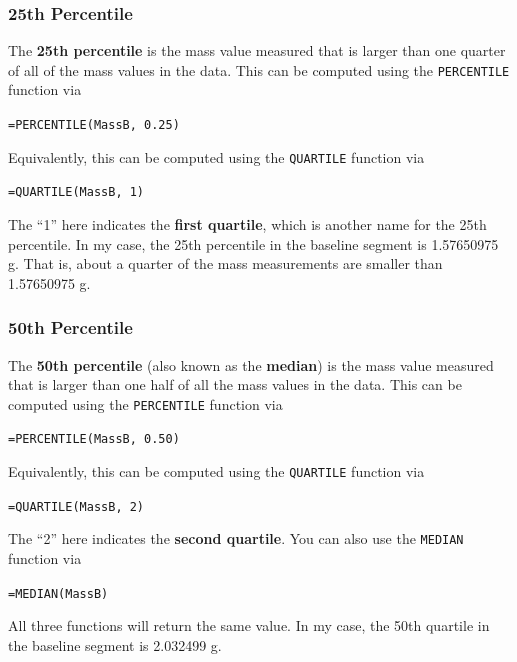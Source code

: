 \subsubsection{25th Percentile}
The \textbf{25th percentile} is the mass value measured that is larger than one quarter of all of the mass values in the data. This can be computed using the \texttt{PERCENTILE} function via
\begin{center}
    \texttt{=PERCENTILE(MassB, 0.25)}
\end{center}
Equivalently, this can be computed using the \texttt{QUARTILE} function via
\begin{center}
    \texttt{=QUARTILE(MassB, 1)}
\end{center}
The ``1'' here indicates the \textbf{first quartile}, which is another name for the 25th percentile. In my case, the 25th percentile in the baseline segment is 1.57650975 g. That is, about a quarter of the mass measurements are smaller than 1.57650975 g.
\subsubsection{50th Percentile}
The \textbf{50th percentile} (also known as the \textbf{median}) is the mass value measured that is larger than one half of all the mass values in the data. This can be computed using the \texttt{PERCENTILE} function via
\begin{center}
    \texttt{=PERCENTILE(MassB, 0.50)}
\end{center}
Equivalently, this can be computed using the \texttt{QUARTILE} function via
\begin{center}
    \texttt{=QUARTILE(MassB, 2)}
\end{center}
The ``2'' here indicates the \textbf{second quartile}. You can also use the \texttt{MEDIAN} function via
\begin{center}
    \texttt{=MEDIAN(MassB)}
\end{center}
All three functions will return the same value. In my case, the 50th quartile in the baseline segment is 2.032499 g.
